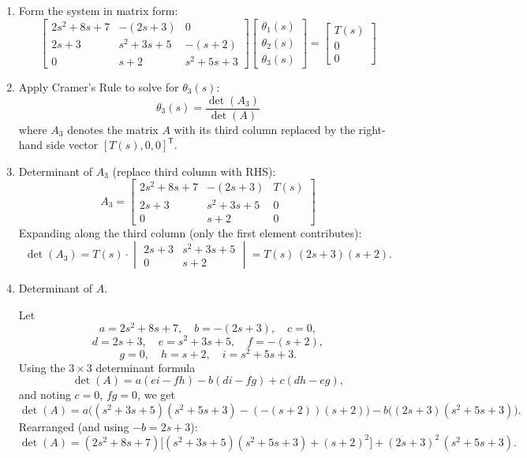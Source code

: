 \documentclass[11pt]{article}
\begin{document}
\begin{enumerate}[label=(\alph*), itemindent=*, leftmargin=*, nolistsep]
    \item Form the system in matrix form:
    \[
    \begin{bmatrix}
    2s^2 + 8s + 7 & -(2s + 3) & 0 \\[6pt]
    2s + 3 & s^2 + 3s + 5 & -(s + 2) \\[6pt]
    0 & s + 2 & s^2 + 5s + 3
    \end{bmatrix}
    \begin{bmatrix}
    \theta_1(s) \\[4pt] \theta_2(s) \\[4pt] \theta_3(s)
    \end{bmatrix}
    =
    \begin{bmatrix}
    T(s) \\[4pt] 0 \\[4pt] 0
    \end{bmatrix}
    \]

    \item Apply Cramer's Rule to solve for $\theta_3(s)$:
    \[
    \theta_3(s) = \frac{\det(A_3)}{\det(A)}
    \]
    where $A_3$ denotes the matrix $A$ with its third column replaced by the right-hand side vector $[T(s),0,0]^\mathsf{T}$.

    \item Determinant of $A_3$ (replace third column with RHS):
    \[
    A_3 =
    \begin{bmatrix}
    2s^2 + 8s + 7 & -(2s + 3) & T(s) \\
    2s + 3 & s^2 + 3s + 5 & 0 \\
    0 & s + 2 & 0
    \end{bmatrix}
    \]
    Expanding along the third column (only the first element contributes):
    \[
    \det(A_3) = T(s)\cdot
    \begin{vmatrix}
    2s + 3 & s^2 + 3s + 5 \\
    0 & s + 2
    \end{vmatrix}
    = T(s)\,(2s + 3)(s + 2).
    \]

    \item Determinant of $A$.

    Let
    \[
    a = 2s^2 + 8s + 7,\quad b = -(2s+3),\quad c = 0,
    \]
    \[
    d = 2s+3,\quad e = s^2+3s+5,\quad f = -(s+2),
    \]
    \[
    g = 0,\quad h = s+2,\quad i = s^2+5s+3.
    \]
    Using the $3\times3$ determinant formula
    \[
    \det(A) = a(ei - fh) - b(di - fg) + c(dh - eg),
    \]
    and noting $c=0$, $fg=0$, we get
    \[
    \det(A) = a\big((s^2+3s+5)(s^2+5s+3) - (-(s+2))(s+2)\big)
    - b\big((2s+3)(s^2+5s+3)\big).
    \]
    Rearranged (and using $-b = 2s+3$):
    \[
    \det(A) = (2s^2+8s+7)\Big[(s^2+3s+5)(s^2+5s+3) + (s+2)^2\Big]
    + (2s+3)^2\,(s^2+5s+3).
    \]


\end{enumerate}
\end{document}
